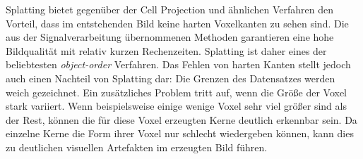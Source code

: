 \documentclass[a4paper,fontsize=12pt,toc=bib,parskip=half,ngerman]{scrartcl}
\begin{document}
Splatting bietet gegen\"uber der Cell Projection und \"ahnlichen Verfahren den Vorteil, dass im entstehenden Bild keine harten Voxelkanten zu sehen sind. Die aus der Signalverarbeitung \"ubernommenen Methoden garantieren eine hohe Bildqualit\"at mit relativ kurzen Rechenzeiten. Splatting ist daher eines der beliebtesten \textit{object-order} Verfahren.
Das Fehlen von harten Kanten stellt jedoch auch einen Nachteil von Splatting dar: Die Grenzen des Datensatzes werden weich gezeichnet. Ein zus\"atzliches Problem tritt auf, wenn die Gr\"o{\ss}e der Voxel stark variiert. Wenn beispielsweise einige wenige Voxel sehr viel gr\"o{\ss}er sind als der Rest, k\"onnen die f\"ur diese Voxel erzeugten Kerne deutlich erkennbar sein. Da einzelne Kerne die Form ihrer Voxel nur schlecht wiedergeben k\"onnen, kann dies zu deutlichen visuellen Artefakten im erzeugten Bild f\"uhren.
\end{document}
